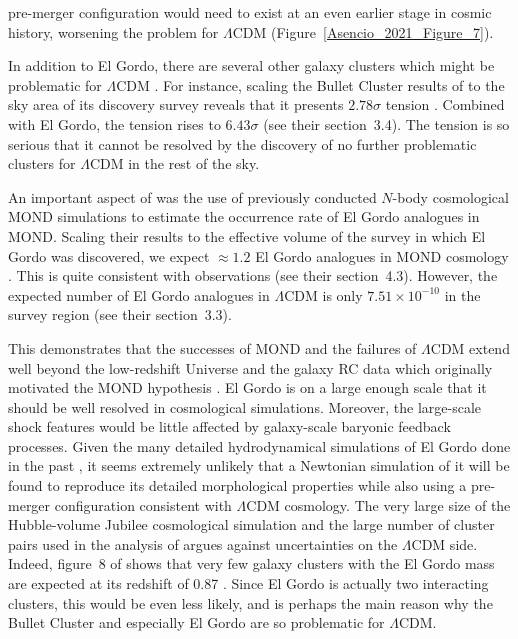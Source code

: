 \documentclass[fleqn,usenatbib,useAMS,onecolumn]{mnras} %
\begin{document}
pre-merger configuration would need to exist at an even earlier stage in cosmic history, worsening the problem for $\Lambda$CDM (Figure~\ref{Asencio_2021_Figure_7}).

In addition to El Gordo, there are several other galaxy clusters which might be problematic for $\Lambda$CDM \citep{Asencio_2021}. For instance, scaling the Bullet Cluster results of \citet{Kraljic_2015} to the sky area of its discovery survey reveals that it presents $2.78\sigma$ tension \citep{Asencio_2021}. Combined with El Gordo, the tension rises to $6.43\sigma$ (see their section~3.4). The tension is so serious that it cannot be resolved by the discovery of no further problematic clusters for $\Lambda$CDM in the rest of the sky.

An important aspect of \citet{Asencio_2021} was the use of previously conducted $N$-body cosmological MOND simulations \citep{Katz_2013} to estimate the occurrence rate of El Gordo analogues in MOND. Scaling their results to the effective volume of the survey in which El Gordo was discovered, we expect $\approx 1.2$ El Gordo analogues in MOND cosmology \citep{Asencio_2021}. This is quite consistent with observations (see their section~4.3). However, the expected number of El Gordo analogues in $\Lambda$CDM is only $7.51 \times 10^{-10}$ in the survey region (see their section~3.3).

This demonstrates that the successes of MOND and the failures of $\Lambda$CDM extend well beyond the low-redshift Universe and the galaxy RC data which originally motivated the MOND hypothesis \citep{Milgrom_1983}. El Gordo is on a large enough scale that it should be well resolved in cosmological simulations. Moreover, the large-scale shock features would be little affected by galaxy-scale baryonic feedback processes. Given the many detailed hydrodynamical simulations of El Gordo done in the past \citep{Donnert_2014, Molnar_2015, Ng_2015, Zhang_2015}, it seems extremely unlikely that a Newtonian simulation of it will be found to reproduce its detailed morphological properties while also using a pre-merger configuration consistent with $\Lambda$CDM cosmology. The very large size of the Hubble-volume Jubilee cosmological simulation and the large number of cluster pairs used in the analysis of \citet{Asencio_2021} argues against uncertainties on the $\Lambda$CDM side. Indeed, figure~8 of \citet{Bohringer_2017} shows that very few galaxy clusters with the El Gordo mass are expected at its redshift of 0.87 \citep{Menanteau_2012}. Since El Gordo is actually two interacting clusters, this would be even less likely, and is perhaps the main reason why the Bullet Cluster and especially El Gordo are so problematic for $\Lambda$CDM.
\end{document}
